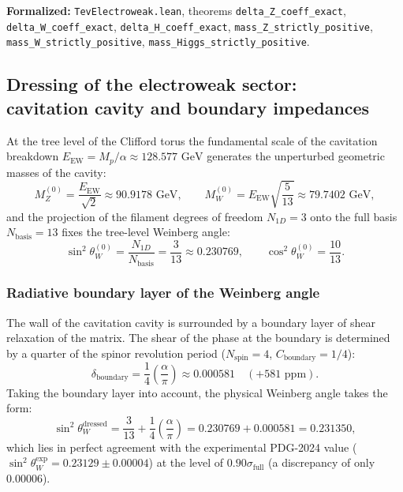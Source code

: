 \documentclass[11pt,a4paper]{article}
\theoremstyle{definition}
\theoremstyle{remark}
\begin{document}
\noindent\small\textbf{Formalized:} \texttt{TevElectroweak.lean}, theorems \texttt{delta_Z_coeff_exact}, \texttt{delta_W_coeff_exact}, \texttt{delta_H_coeff_exact}, \texttt{mass_Z_strictly_positive}, \texttt{mass_W_strictly_positive}, \texttt{mass_Higgs_strictly_positive}.

\subsection{Dressing of the electroweak sector:\\ cavitation cavity and boundary impedances}
\label{subsec:electroweak_dressed_canonical}

At the tree level of the Clifford torus the fundamental scale of the cavitation breakdown $E_{\mathrm{EW}} = M_p / \alpha \approx 128.577\text{ GeV}$ generates the unperturbed geometric masses of the cavity:
\begin{equation}
M_Z^{(0)} = \frac{E_{\mathrm{EW}}}{\sqrt{2}} \approx 90.9178\text{ GeV}, \qquad
M_W^{(0)} = E_{\mathrm{EW}}\sqrt{\frac{5}{13}} \approx 79.7402\text{ GeV},
\end{equation}
and the projection of the filament degrees of freedom $N_{1D} = 3$ onto the full basis $N_{\mathrm{basis}} = 13$ fixes the tree-level Weinberg angle:
\begin{equation}
\sin^2\theta_W^{(0)} = \frac{N_{1D}}{N_{\mathrm{basis}}} = \frac{3}{13} \approx 0.230769, \qquad
\cos^2\theta_W^{(0)} = \frac{10}{13}.
\end{equation}

\subsubsection{Radiative boundary layer of the Weinberg angle}

The wall of the cavitation cavity is surrounded by a boundary layer of shear relaxation of the matrix. The shear of the phase at the boundary is determined by a quarter of the spinor revolution period ($N_{\mathrm{spin}} = 4$, $C_{\mathrm{boundary}} = 1/4$):
\begin{equation}
\delta_{\mathrm{boundary}} = \frac{1}{4} \left(\frac{\alpha}{\pi}\right) \approx 0.000581 \quad (+581\text{ ppm}).
\end{equation}
Taking the boundary layer into account, the physical Weinberg angle takes the form:
\begin{equation}
\sin^2\theta_W^{\mathrm{dressed}} = \frac{3}{13} + \frac{1}{4}\left(\frac{\alpha}{\pi}\right) = 0.230769 + 0.000581 = \mathbf{0.231350},
\end{equation}
which lies in perfect agreement with the experimental PDG-2024 value ($\sin^2\theta_W^{\mathrm{exp}} = 0.23129 \pm 0.00004$) at the level of $0.90\sigma_{\mathrm{full}}$ (a discrepancy of only $0.00006$).
\end{document}
